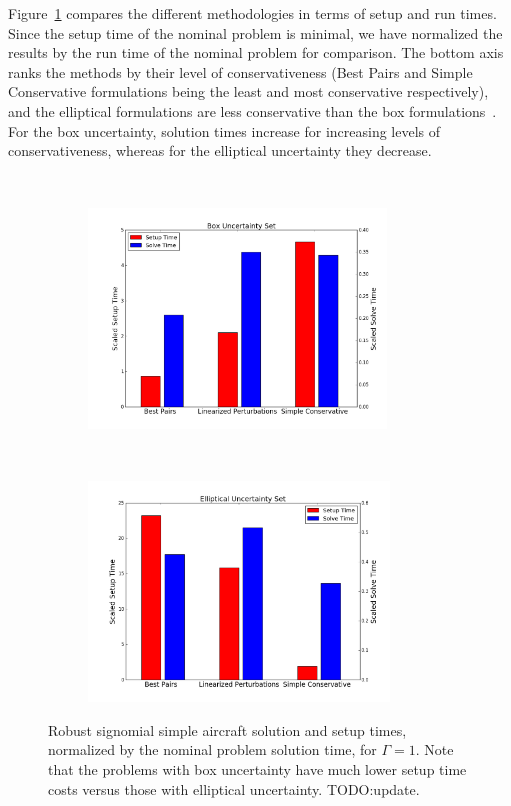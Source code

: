 Figure~\ref{compare_signomial} compares the different methodologies in terms of setup and
run times. Since the setup time of the nominal problem is minimal, we have
normalized the results by the run time of the nominal problem for comparison.
The bottom axis ranks the methods by their level of conservativeness (Best Pairs
and Simple Conservative formulations being the least and most conservative respectively),
and the elliptical formulations are less conservative than the box formulations~\cite{Saab2018}.
For the box uncertainty, solution times increase for increasing levels of conservativeness,
whereas for the elliptical uncertainty they decrease.

\ \\
\begin{figure}[ht]
    \centering
    \captionsetup{justification=centering, font=small}
    \begin{subfigure}{0.49\textwidth}
        \centering
        \includegraphics[height=2.3in]{signomial_simple_flight/box_times.png}
    \end{subfigure}
    ~
    \begin{subfigure}{0.49\textwidth}
        \centering
        \includegraphics[height=2.3in]{signomial_simple_flight/ell_times.png}
    \end{subfigure}
    \caption{Robust signomial simple aircraft solution and setup times, normalized by the
    nominal problem solution time, for $\Gamma = 1$.
    Note that the problems with box uncertainty have much lower setup
    time costs versus those with elliptical uncertainty. TODO:update.}
    \label{compare_signomial}
\end{figure}

